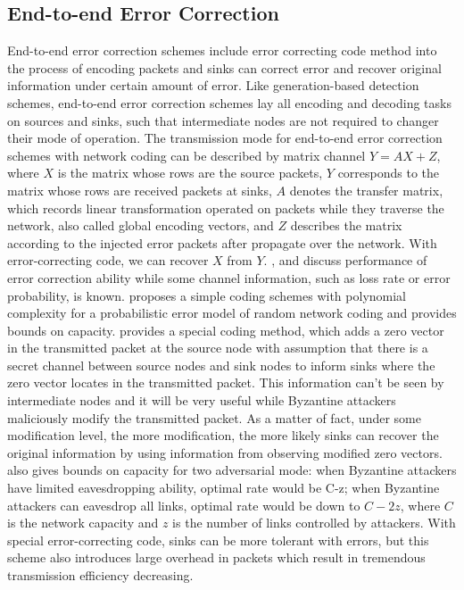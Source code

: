 \documentclass[conference]{IEEEtran}
\begin{document}
\subsection{End-to-end Error Correction}
End-to-end error correction schemes include error correcting code method into the process of encoding packets and sinks can correct error and recover original information under certain amount of error. Like generation-based detection schemes, end-to-end error correction schemes lay all encoding and decoding tasks on sources and sinks, such that intermediate nodes are not required to changer their mode of operation. The transmission mode for end-to-end error correction schemes with network coding can be described by matrix channel {\boldmath$Y = AX + Z$}, where {\boldmath$X$} is the matrix whose rows are the source packets, {\boldmath$Y$} corresponds to the matrix whose rows are received packets at sinks, {\boldmath$A$} denotes the transfer matrix, which records linear transformation operated on packets while they traverse the network, also called global encoding vectors, and {\boldmath$Z$} describes the matrix according to the injected error packets after propagate over the network. With error-correcting code, we can recover {\boldmath$X$} from {\boldmath$Y$}. \cite{codingforerr}, \cite{rank-metric} and \cite{usingrank-metric} discuss performance of error correction ability while some channel information, such as loss rate or error probability, is known. \cite{capacityforRNC} proposes a simple coding schemes with polynomial complexity for a probabilistic error model of random network coding and provides bounds on capacity. \cite{resilient} provides a special coding method, which adds a zero vector in the transmitted packet at the source node with assumption that there is a secret channel between source nodes and sink nodes to inform sinks where the zero vector locates in the transmitted packet. This information can't be seen by intermediate nodes and it will be very useful while Byzantine attackers maliciously modify the transmitted packet. As a matter of fact, under some modification level, the more modification, the more likely sinks can recover the original information by using information from observing modified zero vectors. \cite{resilient} also gives bounds on capacity for two adversarial mode: when Byzantine attackers have limited eavesdropping ability, optimal rate would be C-z; when Byzantine attackers can eavesdrop all links, optimal rate would be down to $C-2z$, where $C$ is the network capacity and $z$ is the number of links controlled by attackers. With special error-correcting code, sinks can be more tolerant with errors, but this scheme also introduces large overhead in packets which result in tremendous transmission efficiency decreasing.
\end{document}
